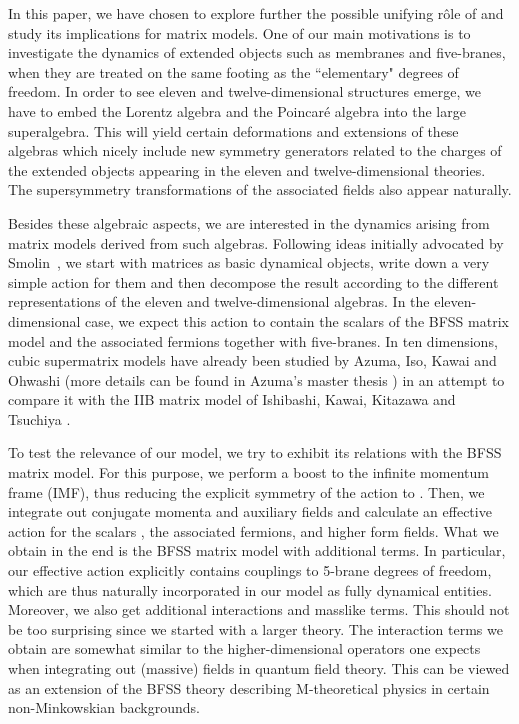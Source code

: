 \documentclass[a4paper,11pt]{article}
\begin{document}
In this paper, we have chosen to explore further the possible unifying r\^ole of \coordHE{} and study 
its implications for matrix models. One of our main motivations is to investigate the dynamics of extended objects 
such as membranes and five-branes, when they are treated on the same footing as the ``elementary" degrees of freedom.
In order to see eleven and twelve-dimensional structures emerge, we have to embed the \coordHE{} Lorentz algebra
and the \coordHE{} Poincar\'e algebra into the large \coordHE{} superalgebra. This will yield certain 
deformations and extensions of these algebras which nicely include new symmetry generators related to the charges 
of the extended objects appearing in the eleven and twelve-dimensional theories. The supersymmetry transformations 
of the associated fields also appear naturally. 

Besides these algebraic aspects, we are interested in the dynamics arising from matrix models derived from
such algebras. Following ideas initially advocated by Smolin~\cite{Smo1}, we start with matrices 
\coordHE{} as basic dynamical objects, write down a very simple action for them and then 
decompose the result according to the different representations of the eleven and twelve-dimensional algebras. 
In the eleven-dimensional case, we expect this action to contain the scalars \coordHE{} of  
the BFSS matrix model and the associated fermions together with five-branes. 
In ten dimensions, cubic supermatrix models have already been studied by Azuma, Iso,  Kawai and Ohwashi \cite{AIKO} 
(more details can be found in Azuma's master thesis \cite{Azu}) in an attempt to compare it with the IIB
matrix model of Ishibashi, Kawai, Kitazawa and Tsuchiya \cite{IKKT}.

To test the relevance of our model, we try to exhibit its relations with the BFSS matrix model. For this purpose,
we perform a boost to the infinite momentum frame (IMF), thus reducing the explicit symmetry of the action to \coordHE{}.
Then, we integrate out conjugate momenta and auxiliary fields and calculate an effective action for the scalars 
\coordHE{}, the associated fermions, and higher form fields. What we obtain in the end is the BFSS matrix model with additional 
terms. In particular, our effective action explicitly contains couplings to 5-brane degrees of freedom, which are 
thus naturally incorporated in our model as fully dynamical entities. Moreover, we also get additional interactions 
and masslike terms. This should not be too surprising since we started with a larger theory.
The interaction terms we obtain are somewhat similar to the higher-dimensional operators one expects when integrating out 
(massive) fields in quantum field theory. This can be viewed as an extension of the BFSS theory
describing M-theoretical physics in certain non-Minkowskian backgrounds.
\end{document}
